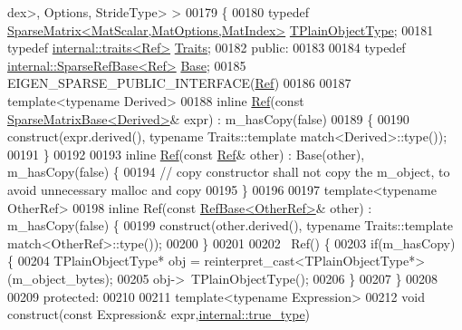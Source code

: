 \begin{DoxyCode}
      dex>, Options, StrideType> >
00179 \{
00180     \textcolor{keyword}{typedef} \hyperlink{group___sparse_core___module_class_eigen_1_1_sparse_matrix}{SparseMatrix<MatScalar,MatOptions,MatIndex>} 
      \hyperlink{group___sparse_core___module_class_eigen_1_1_sparse_matrix}{TPlainObjectType};
00181     \textcolor{keyword}{typedef} \hyperlink{struct_eigen_1_1internal_1_1traits}{internal::traits<Ref>} \hyperlink{struct_eigen_1_1internal_1_1traits}{Traits};
00182   \textcolor{keyword}{public}:
00183 
00184     \textcolor{keyword}{typedef} \hyperlink{class_eigen_1_1internal_1_1_sparse_ref_base}{internal::SparseRefBase<Ref>} \hyperlink{class_eigen_1_1internal_1_1_sparse_ref_base}{Base};
00185     EIGEN\_SPARSE\_PUBLIC\_INTERFACE(\hyperlink{group___core___module_class_eigen_1_1_ref}{Ref})
00186 
00187     \textcolor{keyword}{template}<\textcolor{keyword}{typename} Derived>
00188     \textcolor{keyword}{inline} \hyperlink{group___core___module_class_eigen_1_1_ref}{Ref}(\textcolor{keyword}{const} \hyperlink{group___sparse_core___module_class_eigen_1_1_sparse_matrix_base}{SparseMatrixBase<Derived>}& expr) : m\_hasCopy(\textcolor{keyword}{false})
00189     \{
00190       construct(expr.derived(), \textcolor{keyword}{typename} Traits::template match<Derived>::type());
00191     \}
00192 
00193     \textcolor{keyword}{inline} \hyperlink{group___core___module_class_eigen_1_1_ref}{Ref}(\textcolor{keyword}{const} \hyperlink{group___core___module_class_eigen_1_1_ref}{Ref}& other) : Base(other), m\_hasCopy(\textcolor{keyword}{false}) \{
00194       \textcolor{comment}{// copy constructor shall not copy the m\_object, to avoid unnecessary malloc and copy}
00195     \}
00196 
00197     \textcolor{keyword}{template}<\textcolor{keyword}{typename} OtherRef>
00198     \textcolor{keyword}{inline} Ref(\textcolor{keyword}{const} \hyperlink{class_eigen_1_1_ref_base}{RefBase<OtherRef>}& other) : m\_hasCopy(\textcolor{keyword}{false}) \{
00199       construct(other.derived(), \textcolor{keyword}{typename} Traits::template match<OtherRef>::type());
00200     \}
00201 
00202     ~Ref() \{
00203       \textcolor{keywordflow}{if}(m\_hasCopy) \{
00204         TPlainObjectType* obj = \textcolor{keyword}{reinterpret\_cast<}TPlainObjectType*\textcolor{keyword}{>}(m\_object\_bytes);
00205         obj->~TPlainObjectType();
00206       \}
00207     \}
00208 
00209   \textcolor{keyword}{protected}:
00210 
00211     \textcolor{keyword}{template}<\textcolor{keyword}{typename} Expression>
00212     \textcolor{keywordtype}{void} construct(\textcolor{keyword}{const} Expression& expr,\hyperlink{struct_eigen_1_1internal_1_1true__type}{internal::true\_type})

\end{DoxyCode}
